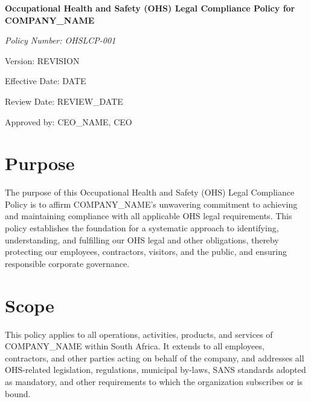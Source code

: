 \documentclass[12pt]{article}
\begin{document}
\begin{titlepage}
    \centering
    \vspace*{2cm}
    {\LARGE\bfseries Occupational Health and Safety (OHS) Legal Compliance Policy for {{COMPANY_NAME}}\par}
    \vspace{1cm}
    {\large\itshape Policy Number: OHSLCP-001\par}
    \vspace{0.5cm}
    {\normalsize Version: {{REVISION}}\par}
    \vspace{0.5cm}
    {\normalsize Effective Date: {{DATE}}\par}
    \vspace{0.5cm}
    {\normalsize Review Date: {{REVIEW_DATE}}\par}
    \vspace{2cm}
    {\normalsize Approved by: {{CEO_NAME}}, CEO\par}
\end{titlepage}

\section{Purpose}
The purpose of this Occupational Health and Safety (OHS) Legal Compliance Policy is to affirm {{COMPANY_NAME}}'s unwavering commitment to achieving and maintaining compliance with all applicable OHS legal requirements. This policy establishes the foundation for a systematic approach to identifying, understanding, and fulfilling our OHS legal and other obligations, thereby protecting our employees, contractors, visitors, and the public, and ensuring responsible corporate governance.

\section{Scope}
This policy applies to all operations, activities, products, and services of {{COMPANY_NAME}} within South Africa. It extends to all employees, contractors, and other parties acting on behalf of the company, and addresses all OHS-related legislation, regulations, municipal by-laws, SANS standards adopted as mandatory, and other requirements to which the organization subscribes or is bound.
\end{document}
